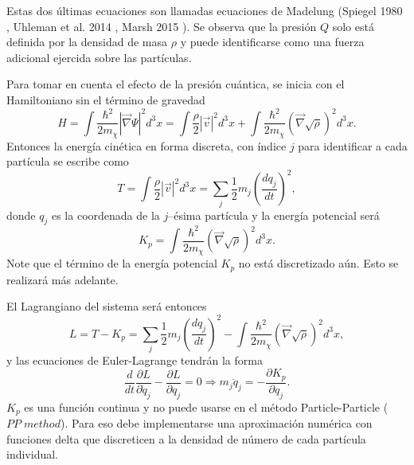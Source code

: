 \documentclass[a4paper,openright,12pt]{book}
\begin{document}
Estas dos últimas ecuaciones son llamadas ecuaciones de Madelung (Spiegel 1980 \cite{3.2}, Uhleman et al. 2014 \cite{3.3}, Marsh 2015 \cite{3.4}). Se observa que la presión $Q$ solo está definida por la densidad de masa $\rho$ y puede identificarse como una fuerza adicional ejercida sobre las partículas.

Para tomar en cuenta el efecto de la presión cuántica, se inicia con el Hamiltoniano sin el término de gravedad
\begin{equation}
H = \int \frac{\hbar^{2}}{2 m_{\chi}} |\vec{\nabla}\Psi|^{2}d^{3}x
  = \int \frac{\rho}{2} |\vec{v}|^{2}d^{3}x + \int \frac{\hbar^{2}}{2 m_{\chi}} (\vec{\nabla}\sqrt{\rho})^{2}d^{3}x.\label{eqn 3.8}
\end{equation}
Entonces la energía cinética en forma discreta, con índice $j$ para identificar a cada partícula se escribe como
\begin{equation}
T = \int \frac{\rho}{2} |\vec{v}|^{2}d^{3}x = \sum_{j} \frac{1}{2} m_{j} \left(\frac{d q_{j}}{dt}\right)^{2}, \label{eqn 3.9}
\end{equation}
donde $q_{j}$ es la coordenada de la $j$--ésima partícula y la energía potencial será 
\begin{equation}
K_{p} = \int \frac{\hbar^{2}}{2 m_{\chi}} (\vec{\nabla}\sqrt{\rho})^{2}d^{3}x. \label{eqn 3.10}
\end{equation}
Note que el término de la energía potencial $K_{p}$ no está discretizado aún. Esto se realizará más adelante.

El Lagrangiano del sistema será entonces 
\begin{equation}
L = T - K_{p}
  =
\sum_{j} \frac{1}{2} m_{j} \left(\frac{d q_{j}}{dt}\right)^{2}
-
 \int \frac{\hbar^{2}}{2 m_{\chi}} (\vec{\nabla}\sqrt{\rho})^{2}d^{3}x,\label{eqn 3.11}  
\end{equation}
y las ecuaciones de Euler-Lagrange tendrán la forma
\begin{equation}
\frac{d}{dt}\frac{\partial L}{\partial \dot{q}_{j}} - \frac{\partial L }{\partial q_{j}} = 0 
\Rightarrow 
m_{j} \ddot{q}_{j} = - \frac{\partial K_{p}}{\partial q_{j}}.\label{eqn 3.12}
\end{equation}
$K_{p}$ es una función continua y no puede usarse en el método Particle-Particle ($PP \; method$). Para eso debe implementarse una aproximación numérica con funciones delta que discreticen a la densidad de número de cada partícula individual.
\end{document}
